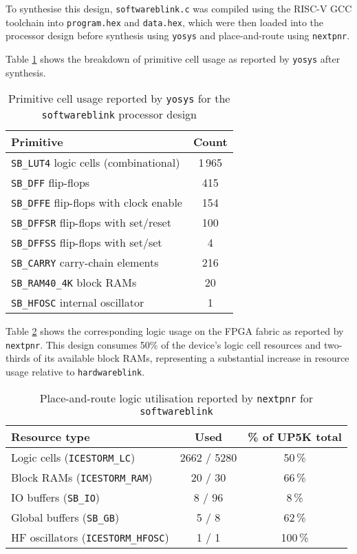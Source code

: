 \documentclass[a4paper,10pt]{article}
\begin{document}
To synthesise this design, \texttt{softwareblink.c} was compiled 
using the RISC-V GCC toolchain into \texttt{program.hex} and \texttt{data.hex}, 
which were then loaded into the processor design 
before synthesis using \texttt{yosys} and place-and-route using \texttt{nextpnr}.

Table \ref{tab:software_yosys_report} shows the breakdown of primitive cell usage 
as reported by \texttt{yosys} after synthesis.

\begin{table}[H]
    \centering
    \begin{tabular}{|l|c|}
        \hline
        \textbf{Primitive} & \textbf{Count} \\
        \hline
        \texttt{SB\_LUT4} logic cells (combinational) & 1\,965 \\
        \texttt{SB\_DFF} flip-flops & 415 \\
        \texttt{SB\_DFFE} flip-flops with clock enable & 154 \\
        \texttt{SB\_DFFSR} flip-flops with set/reset & 100 \\
        \texttt{SB\_DFFSS} flip-flops with set/set & 4 \\
        \texttt{SB\_CARRY} carry-chain elements & 216 \\
        \texttt{SB\_RAM40\_4K} block RAMs & 20 \\
        \texttt{SB\_HFOSC} internal oscillator & 1 \\
        \hline
    \end{tabular}
    \caption{Primitive cell usage reported by 
    \texttt{yosys} for the \texttt{softwareblink} processor design}
    \label{tab:software_yosys_report}
\end{table}

Table \ref{tab:software_pnr_report} shows the corresponding logic usage 
on the FPGA fabric as reported by \texttt{nextpnr}. 
This design consumes 50\% of the device's logic cell resources 
and two-thirds of its available block RAMs, 
representing a substantial increase in resource usage 
relative to \texttt{hardwareblink}.

\begin{table}[H]
    \centering
    \begin{tabularx}{0.7\textwidth}{X c c}
        \toprule
        Resource type & Used & \% of UP5K total \\ \midrule
        Logic cells (\texttt{ICESTORM\_LC}) & 2662 / 5280 & 50\,\% \\
        Block RAMs (\texttt{ICESTORM\_RAM})& 20 / 30 & 66\,\% \\
        IO buffers (\texttt{SB\_IO}) & 8 / 96 & 8\,\% \\
        Global buffers (\texttt{SB\_GB}) & 5 / 8 & 62\,\% \\
        HF oscillators (\texttt{ICESTORM\_HFOSC}) & 1 / 1 & 100\,\% \\
        \bottomrule
    \end{tabularx}
    \caption{Place-and-route logic utilisation reported by 
    \texttt{nextpnr} for \texttt{softwareblink}}
    \label{tab:software_pnr_report}
\end{table}
\end{document}
